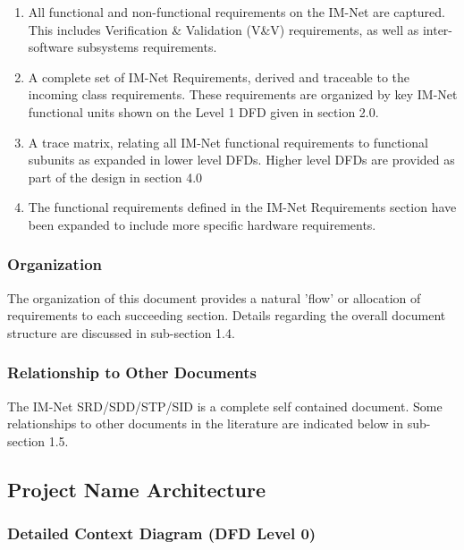 \documentclass[letterpaper]{article}
\begin{document}
\begin{enumerate}
\item  All functional and non-functional requirements on the IM-Net are captured.  This includes Verification \& Validation (V\&V) requirements, as well as inter-software subsystems requirements.

\item  A complete set of IM-Net Requirements, derived and traceable to the incoming class requirements.  These requirements are organized by key IM-Net functional units shown on the Level 1 DFD given in section 2.0.

\item  A trace matrix, relating all IM-Net functional requirements to functional subunits as expanded in lower level DFDs. Higher level DFDs are provided as part of the design in section 4.0

\item  The functional requirements defined in the IM-Net Requirements section have been expanded to include more specific hardware requirements.
\end{enumerate}

\subsubsection{\textcolor{subsubsection}{Organization}}

The organization of this document provides a natural 'flow' or allocation of requirements to each succeeding section. Details regarding the overall document structure are discussed in sub-section 1.4.

\subsubsection{\textcolor{subsubsection}{Relationship to Other Documents}}

The IM-Net SRD/SDD/STP/SID is a complete self contained document. Some relationships to other documents in the literature are indicated below in sub-section 1.5.

\subsection{\textcolor{subsection}{Project Name Architecture}}
 
\subsubsection{\textcolor{subsubsection}{Detailed Context Diagram (DFD Level 0)}}
\end{document}
